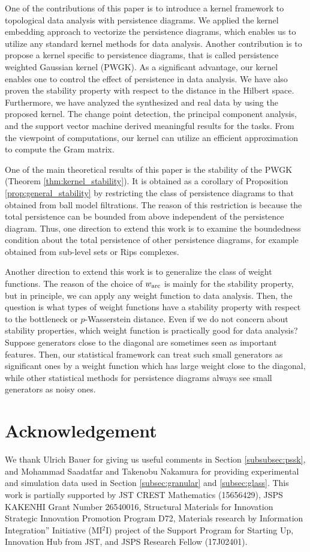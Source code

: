 \documentclass{article}
\begin{document}
One of the contributions of this paper is to introduce a kernel framework to topological data analysis with persistence diagrams.
We applied the kernel embedding approach to vectorize the persistence diagrams, which enables us to utilize any standard kernel methods for data analysis.
Another contribution is to propose a kernel specific to persistence diagrams, that is called persistence weighted Gaussian kernel (PWGK).
As a significant advantage, our kernel enables one to control the effect of persistence in data analysis.
We have also proven the stability property with respect to the distance in the Hilbert space.
Furthermore, we have analyzed the synthesized and real data by using the proposed kernel.
The change point detection, the principal component analysis, and the support vector machine derived meaningful results for the tasks. From the viewpoint of computations, our kernel can utilize an efficient approximation to compute the Gram matrix.

One of the main theoretical results of this paper is the stability of the PWGK (Theorem \ref{thm:kernel_stability}).
It is obtained as a corollary of Proposition \ref{prop:general_stability} by restricting the class of persistence diagrams to that obtained from ball model filtrations.
The reason of this restriction is because the total persistence can be bounded from above independent of the persistence diagram.
Thus, one direction to extend this work is to examine the boundedness condition about the total persistence of other persistence diagrams, for example obtained from sub-level sets or Rips complexes.

Another direction to extend this work is to generalize the class of weight functions.
The reason of the choice of $w_{{\rm arc}}$ is mainly for the stability property, but in principle, we can apply any weight function to data analysis.
Then, the question is what types of weight functions have a stability property with respect to the bottleneck or $p$-Wasserstein distance.
Even if we do not concern about stability properties, which weight function is practically good for data analysis?
Suppose generators close to the diagonal are sometimes seen as important features.
Then, our statistical framework can treat such small generators as significant ones by a weight function which has large weight close to the diagonal, while other statistical methods for persistence diagrams always see small generators as noisy ones.



\section*{Acknowledgement}
We thank Ulrich Bauer for giving us useful comments in Section \ref{subsubsec:pssk}, and Mohammad Saadatfar and Takenobu Nakamura for providing experimental and simulation data used in Section \ref{subsec:granular} and \ref{subsec:glass}.
This work is partially supported by JST CREST Mathematics (15656429), JSPS KAKENHI Grant Number 26540016, Structural Materials for Innovation Strategic Innovation Promotion Program D72, Materials research by Information Integration” Initiative (MI$^{2}$I) project of the Support Program for Starting Up, Innovation Hub from JST, and JSPS Research Fellow (17J02401).
\end{document}
